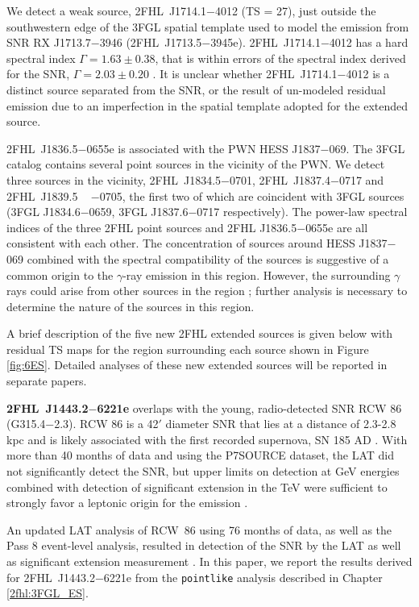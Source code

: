 We detect a weak source, 2FHL~J1714.1$-$4012 (TS = 27), just outside the southwestern edge of the 3FGL spatial template used to model the emission from SNR RX J1713.7$-$3946 (2FHL~J1713.5$-$3945e). 2FHL~J1714.1$-$4012 has a hard spectral index $\Gamma = 1.63 \pm 0.38$, that is within errors of the spectral index derived for the SNR, $\Gamma = 2.03 \pm 0.20$ \citep{Abdo11-RXJ1713}. It is unclear whether 2FHL~J1714.1$-$4012 is a distinct source separated from the SNR, or the result of un-modeled residual emission due to an imperfection in the spatial template adopted for the extended source.


2FHL~J1836.5$-$0655e is associated with the PWN HESS J1837$-$069. The 3FGL catalog contains  several point sources in the vicinity of the PWN. We detect three sources in the vicinity, 2FHL~J1834.5$-$0701, 2FHL~J1837.4$-$0717 and 2FHL~J1839.5 ~ $-$0705, the first two of which are coincident with 3FGL sources (3FGL J1834.6$-$0659, 3FGL J1837.6$-$0717 respectively). The power-law spectral indices of the three 2FHL point sources and 2FHL J1836.5$-$0655e are all consistent with each other. The concentration of sources around HESS J1837$-$069 combined with the spectral compatibility of the sources is suggestive of a common origin to the $\gamma$-ray emission in this region. However, the surrounding $\gamma$ rays could arise from other sources in the region \citep{Gotthelf08}; further analysis is necessary to determine the nature of the sources in this region. 

A brief description of the five new 2FHL extended sources is given below with residual TS maps for the region surrounding each source shown in Figure \ref{fig:6ES}. Detailed analyses of these new extended sources will be reported in separate papers.


{\bfseries 2FHL~J1443.2$-$6221e} overlaps with the young, radio-detected SNR RCW 86 (G315.4−2.3). RCW 86 is a 42$'$ diameter SNR that lies at a distance of 2.3-2.8 kpc and is likely associated with the first recorded supernova, SN 185 AD \citep{Rosado96,Sollerman03}. With more than 40 months of data and using the  P7SOURCE dataset, the LAT did not significantly detect the SNR, but upper limits on detection at GeV energies combined with detection of significant extension in the TeV \citep{Aharonian09} were sufficient to strongly favor a leptonic origin for the emission \citep{Lemoine-Goumard12}.

An updated LAT analysis of RCW~86 using 76 months of data, as well as the Pass 8 event-level analysis, resulted in detection of the SNR by the LAT as well as significant extension measurement \citep[the former published after \cite{2FHL}]{Ajello_rcw86,Hewitt15a}. In this paper, we report the results derived for 2FHL~J1443.2$-$6221e from the {\tt pointlike} analysis described in Chapter \ref{2fhl:3FGL_ES}.

